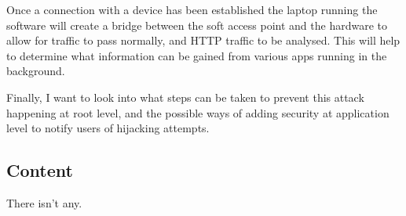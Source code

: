 Once a connection with a device has been established the laptop running the software will create a bridge between the soft access point and the hardware to allow for traffic to pass normally, and HTTP traffic to be analysed. This will help to determine what information can be gained from various apps running in the background. 

Finally, I want to look into what steps can be taken to prevent this attack happening at root level, and the possible ways of adding security at application level to notify users of hijacking attempts.

\subsection{Content}
There isn't any.
\clearpage